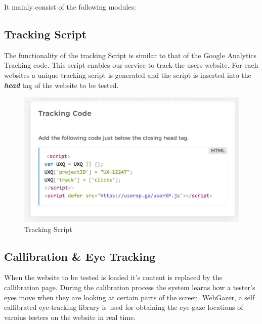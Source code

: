 \documentclass[12pt,a4paper,final]{extreport}
\begin{document}
It mainly consist of the following modules:
\subsection{Tracking Script}
The functionality of the tracking Script is similar to that of the Google Analytics Tracking code. This script enables our service to track the users website. For each websites a unique tracking script is generated and the script is inserted into the \textbf{\textit{head}} tag of the website to be tested.
\begin{figure}[H]
    \centering
    \includegraphics[width=\linewidth]{tracking-script.png}
    \caption{Tracking Script}
\end{figure}

\subsection{Callibration \& Eye Tracking}
When the website to be tested is loaded it's content is replaced by the callibration page. During the calibration process the system learns how a tester’s eyes move when they are looking at certain parts of the screen.
WebGazer, a self callibrated eye-tracking library is used for obtaining the eye-gaze locations of varoius testers on the website in real time.
\end{document}
